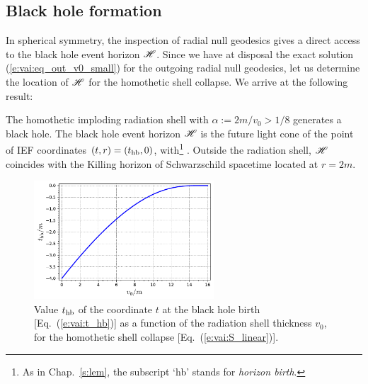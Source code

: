 \subsection{Black hole formation} \label{s:vai:BH_formation}

In spherical symmetry, the inspection of radial null geodesics gives
a direct access to the black hole event horizon $\mathscr{H}$.
Since we have at disposal the exact solution
(\ref{e:vai:eq_out_v0_small}) for the outgoing radial null geodesics,
let us determine the location of $\mathscr{H}$ for the homothetic
shell collapse.
We arrive at the following result:
\begin{greybox}
The homothetic imploding radiation shell with $\alpha := 2m/v_0 > 1/8$
generates a black hole. The black hole event horizon $\mathscr{H}$
is the future light cone of the point of IEF coordinates
$(t, r) = (t_{\rm hb}, 0)$, with\footnote{As in Chap.~\ref{s:lem}, the subscript `hb' stands
for \emph{horizon birth}.}
\be \label{e:vai:t_hb}
     .
\ee
Outside the radiation shell, $\mathscr{H}$ coincides with the
Killing horizon of Schwarzschild spacetime located at $r=2m$.
\end{greybox}

\begin{figure}
\centerline{\includegraphics[width=0.6\textwidth]{vai_thb_v0.pdf}}
\caption[]{\label{f:vai:thb_v0} \footnotesize
Value $t_{\rm hb}$ of the coordinate $t$ at the black hole birth [Eq.~(\ref{e:vai:t_hb})]
as a function of the radiation shell thickness $v_0$, for
the homothetic shell collapse [Eq.~(\ref{e:vai:S_linear})].
}
\end{figure}


